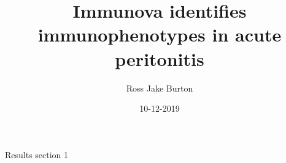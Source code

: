 \documentclass{article}
\title{Immunova identifies immunophenotypes in acute peritonitis}
\date{10-12-2019}
\author{Ross Jake Burton}
\begin{document}
	\maketitle
	\newpage
	
	Results section 1
	
\end{document}
